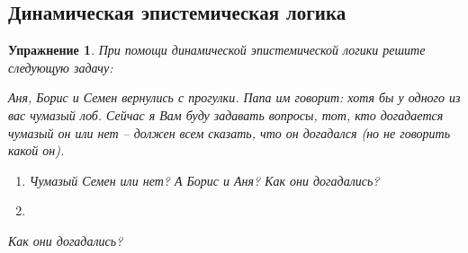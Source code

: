 \documentclass[11pt]{article}
\newtheorem{exercise}[theorem]{Упражнение}
\begin{document}
\subsection{Динамическая эпистемическая логика}


\begin{exercise} При помощи динамической эпистемической логики решите следующую задачу:

Аня, Борис и Семен вернулись с прогулки. Папа им говорит: хотя бы у одного из вас  чумазый лоб. Сейчас я Вам буду задавать вопросы, тот, кто догадается чумазый он или нет – должен всем сказать, что он догадался (но не говорить какой он).

\begin{enumerate}
	\item 
{}
\begin{center}
Чумазый Семен или нет? А Борис и Аня? Как они догадались?	
\end{center}

\item 

\end{enumerate}

\begin{center}
Как они догадались?	
\end{center}
\end{exercise}
\end{document}
